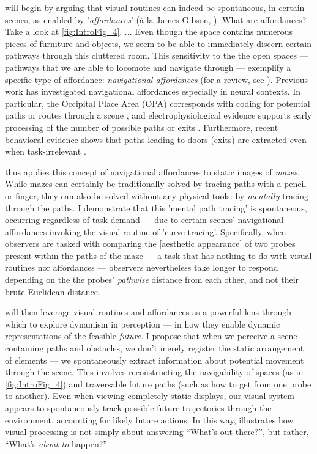  will begin by arguing that visual routines can indeed be spontaneous, in certain scenes, as enabled by '\textit{affordances}' (à la James Gibson, \citeyear{gibson_ecological_1979}). What are affordances? Take a look at \cref{fig:IntroFig_4}. ...  Even though the space contains numerous pieces of furniture and objects, we seem to be able to immediately discern certain pathways through this cluttered room.  This sensitivity to the the open spaces --- pathways that we are able to locomote and navigate through --- exemplify a specific type of affordance: \textit{navigational affordances} (for a review, see \cite{gregorians_affordances_2022}).  Previous work has investigated navigational affordances especially in neural contexts. In particular, the Occipital Place Area (OPA) corresponds with coding for potential paths or routes through a scene \parencite{bonner_coding_2017, bonner_computational_2018}, and electrophysiological evidence supports early processing of the number of possible paths or exits \parencite{harel_early_2022}.  Furthermore, recent behavioral evidence shows that paths leading to doors (exits) are extracted even when task-irrelevant \parencite{belledonne_automatic_2021, belledonne_navigational_2022}.

 thus applies this concept of navigational affordances to static images of \textit{mazes}. While mazes can certainly be traditionally solved by tracing paths with a pencil or finger, they can also be solved without any physical tools: by \textit{mentally} tracing through the paths.  I demonstrate that this 'mental path tracing' is spontaneous, occurring regardless of task demand --- due to certain scenes' navigational affordances invoking the visual routine of 'curve tracing'.  Specifically, when observers are tasked with comparing the [aesthetic appearance] of two probes present within the paths of the maze --- a task that has nothing to do with visual routines nor affordances --- observers nevertheless take longer to respond depending on the the probes' \textit{pathwise} distance from each other, and not their brute Euclidean distance.

 will then leverage visual routines and affordances as a powerful lens through which to explore dynamism in perception --- in how they enable dynamic representations of the feasible \textit{future}. I propose that when we perceive a scene containing paths and obstacles, we don't merely register the static arrangement of elements --- we spontaneously extract information about potential movement through the scene. This involves reconstructing the navigability of spaces (as in \cref{fig:IntroFig_4}) and traversable future paths (such as how to get from one probe to another). Even when viewing completely static displays, our visual system appears to spontaneously track possible future trajectories through the environment, accounting for likely future actions. In this way,  illustrates how visual processing is not simply about answering “What’s out there?”, but rather, “What’s \textit{about to} happen?”


